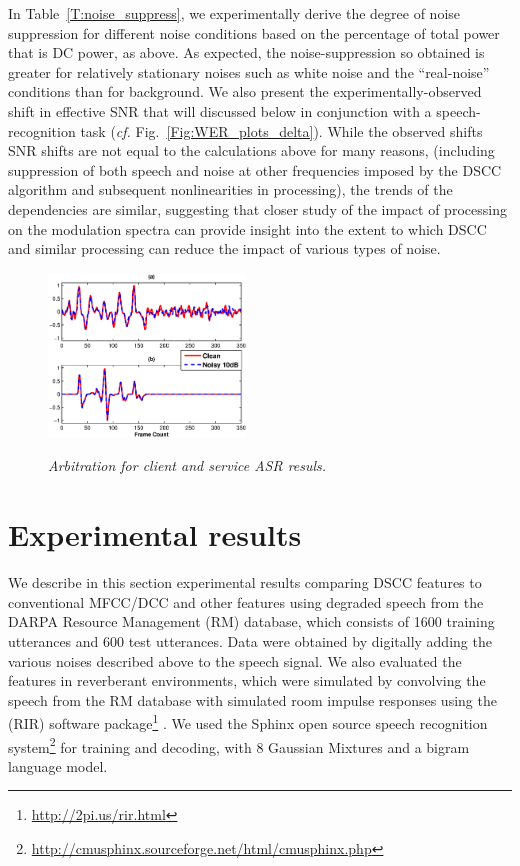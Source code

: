 \documentclass{article}
\begin{document}
In Table~\ref{T:noise_suppress}, we experimentally derive the degree of noise suppression for different noise conditions based on the percentage of total power that is DC power, as above. As expected,
the noise-suppression so obtained is greater for relatively stationary noises such as  white noise and the ``real-noise''   conditions than for background.
We also present the experimentally-observed  shift in effective SNR that will discussed below in conjunction with a speech-recognition task (\emph{cf.} Fig.~\ref{Fig:WER_plots_delta}).
While the observed shifts SNR   shifts are not equal to the calculations above for many reasons, (including suppression of both speech and noise at other frequencies imposed by the DSCC algorithm and subsequent nonlinearities in processing), the trends of the dependencies are similar, suggesting that closer study of the impact of processing on the modulation spectra can provide insight into the extent to which DSCC and similar processing can reduce the impact of various types of noise.

\begin{figure}[h]
\centering
{\includegraphics[width=0.47\textwidth]{Mel8-Delta.eps}}
\caption{\it Arbitration for client and service ASR resuls.}
\label{Fig:Arbitration}
\end{figure}



\section{Experimental results}\label{sec:experiments}

We describe in this section experimental results comparing DSCC features to conventional MFCC/DCC and other features using  degraded speech from  the DARPA Resource Management (RM) database, which consists  of  1600 training utterances and 600 test utterances. Data  were obtained by digitally adding the various noises described above to the speech signal. We also evaluated the features in reverberant environments, which were simulated by   convolving the speech from the  RM database with simulated room impulse responses using the (RIR) software package\footnote{\url{http://2pi.us/rir.html}} \cite{LIFE10}. We used the Sphinx open source speech recognition   system\footnote{\url{http://cmusphinx.sourceforge.net/html/cmusphinx.php}} for   training and decoding, with   8 Gaussian Mixtures  and a bigram language model.
\end{document}
